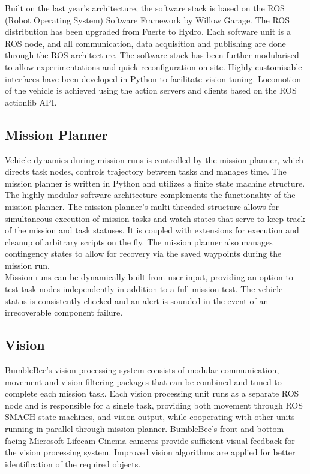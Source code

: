 \documentclass[journal,12pt]{IEEEtran}
\begin{document}
Built on the last year's architecture, the software stack is based on the ROS (Robot Operating System) Software Framework by Willow Garage. The ROS distribution has been upgraded from Fuerte to Hydro. Each software unit is a ROS node, and all communication, data acquisition and publishing are done through the ROS architecture. The software stack has been further modularised to allow experimentations and quick reconfiguration on-site. Highly customisable interfaces have been developed in Python to facilitate vision tuning. Locomotion of the vehicle is achieved using the action servers and clients based on the ROS actionlib API. 

\subsection{Mission Planner} 
Vehicle dynamics during mission runs is controlled by the mission
planner, which directs task nodes, controls trajectory between tasks and manages 
time. The mission planner is written in Python and utilizes a finite state 
machine structure. \\

The highly modular software architecture complements the functionality of the mission planner. The mission planner's multi-threaded structure allows for simultaneous execution of mission tasks and watch states that serve to keep track of the mission and task statuses. It is coupled with extensions for execution and cleanup of arbitrary scripts on the fly. The mission planner also manages contingency states to allow for recovery via the saved waypoints during the mission run. \\

Mission runs can be dynamically built from user input, providing an option to test task nodes independently in addition to a full mission test. The vehicle status is consistently checked and an alert is sounded in the event of an irrecoverable component failure. 

\subsection{Vision}
BumbleBee’s vision processing system consists of modular communication, movement and vision filtering packages that can be combined and tuned to complete each mission task. Each vision processing unit runs as a separate ROS node and is responsible for a single task, providing both movement through ROS SMACH state machines, and vision output, while cooperating with other units running in parallel through mission planner. BumbleBee’s front and bottom facing Microsoft Lifecam Cinema cameras provide sufficient visual feedback for the vision processing system. Improved vision algorithms are applied for better identification of the required objects. \\
\end{document}
